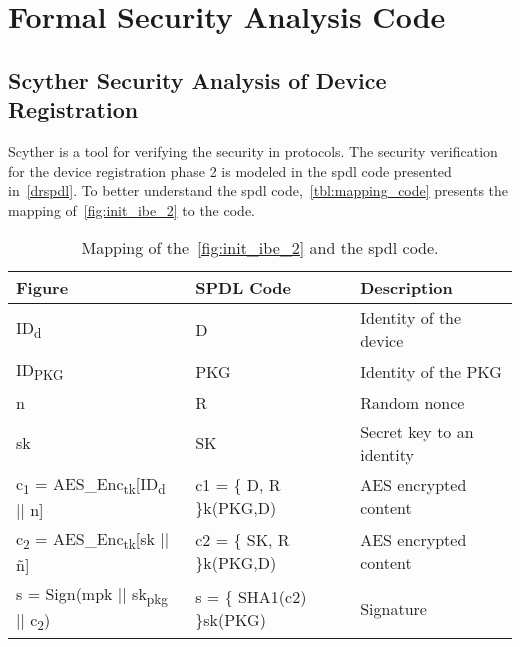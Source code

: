 \chapter{Formal Security Analysis Code}\label{apx:code}


\section{Scyther Security Analysis of Device Registration}\label{apx:scyther-analysis-dr}
Scyther is a tool for verifying the security in protocols.
The security verification for the device registration phase 2 is modeled in the \gls{spdl} code presented in~\autoref{drspdl}.
To better understand the \gls{spdl} code,~\autoref{tbl:mapping_code} presents the mapping of~\autoref{fig:init_ibe_2} to the code.

\begin{table}[h]
  \begin{tabular}{lll}
  Figure      				    & SPDL Code     			& Description 				       \\ \hline
  ID\textsubscript{d}  		& D   						    & Identity of the device 	   \\ %
  ID\textsubscript{PKG}   & PKG      					  & Identity of the PKG 		   \\ %
  n      					        & R            				& Random nonce 				       \\ %
  sk      					      & SK           				& Secret key to an identity	 \\ %
  c\textsubscript{1} = AES\_Enc\textsubscript{tk}[ID\textsubscript{d} || n]  & c1 = \{ D, R \}k(PKG,D)   & AES encrypted content		\\ %
  c\textsubscript{2} = AES\_Enc\textsubscript{tk}[sk || \~{n}]     	& c2 = \{ SK, R \}k(PKG,D)	& AES encrypted content 	\\ %
  s = Sign(mpk || sk\textsubscript{pkg} || c\textsubscript{2})      & s = \{ SHA1(c2) \}sk(PKG)   & Signature				\\ %
  \end{tabular}
  \caption[SPDL mapping device registration]{Mapping of the~\autoref{fig:init_ibe_2} and the \gls{spdl} code.}
  \label{tbl:mapping_code}
\end{table}


